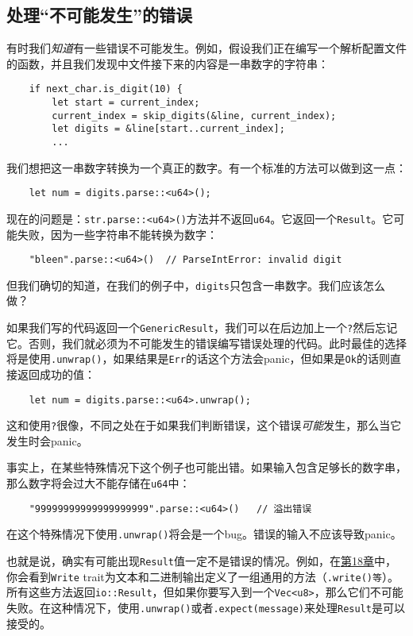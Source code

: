 \subsection{处理“不可能发生”的错误}
有时我们\emph{知道}有一些错误不可能发生。例如，假设我们正在编写一个解析配置文件的函数，并且我们发现中文件接下来的内容是一串数字的字符串：
\begin{verbatim}
    if next_char.is_digit(10) {
        let start = current_index;
        current_index = skip_digits(&line, current_index);
        let digits = &line[start..current_index];
        ...
\end{verbatim}

我们想把这一串数字转换为一个真正的数字。有一个标准的方法可以做到这一点：
\begin{verbatim}
    let num = digits.parse::<u64>();
\end{verbatim}

现在的问题是：\texttt{str.parse::<u64>()}方法并不返回\texttt{u64}。它返回一个\texttt{Result}。它可能失败，因为一些字符串不能转换为数字：
\begin{verbatim}
    "bleen".parse::<u64>()  // ParseIntError: invalid digit
\end{verbatim}

但我们确切的知道，在我们的例子中，\texttt{digits}只包含一串数字。我们应该怎么做？

如果我们写的代码返回一个\texttt{GenericResult}，我们可以在后边加上一个\texttt{?}然后忘记它。否则，我们就必须为不可能发生的错误编写错误处理的代码。此时最佳的选择将是使用\texttt{.unwrap()}，如果结果是\texttt{Err}的话这个方法会panic，但如果是\texttt{Ok}的话则直接返回成功的值：
\begin{verbatim}
    let num = digits.parse::<u64>.unwrap();
\end{verbatim}

这和使用\texttt{?}很像，不同之处在于如果我们判断错误，这个错误\emph{可能}发生，那么当它发生时会panic。

事实上，在某些特殊情况下这个例子也可能出错。如果输入包含足够长的数字串，那么数字将会过大不能存储在\texttt{u64}中：
\begin{verbatim}
    "99999999999999999999".parse::<u64>()   // 溢出错误
\end{verbatim}
在这个特殊情况下使用\texttt{.unwrap()}将会是一个bug。错误的输入不应该导致panic。

也就是说，确实有可能出现\texttt{Result}值一定不是错误的情况。例如，在\hyperref[ch18]{第18章}中，你会看到\texttt{Write} trait为文本和二进制输出定义了一组通用的方法（\texttt{.write()等}）。所有这些方法返回\texttt{io::Result}，但如果你要写入到一个\texttt{Vec<u8>}，那么它们不可能失败。在这种情况下，使用\texttt{.unwrap()}或者\texttt{.expect(message)}来处理\texttt{Result}是可以接受的。

